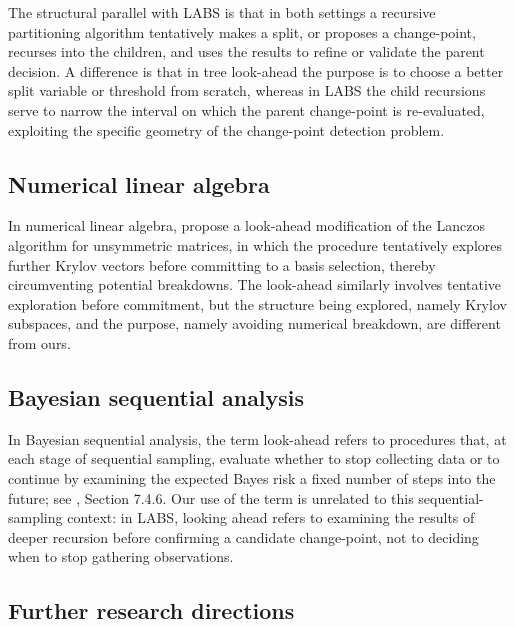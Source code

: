 \documentclass[12pt, a4paper]{article}
\begin{document}
The structural parallel with LABS is that in both settings a recursive partitioning algorithm tentatively makes a split, or proposes a change-point, recurses into the children, and uses the results to refine or validate the parent decision. A difference is that in tree look-ahead the purpose is to choose a better split variable or threshold from scratch, whereas in LABS the child recursions serve to narrow the interval on which the parent change-point is re-evaluated, exploiting the specific geometry of the change-point detection problem.

\subsection{Numerical linear algebra}

In numerical linear algebra, \cite{pt85} propose a look-ahead modification of the Lanczos algorithm for unsymmetric matrices, in which the procedure tentatively explores further Krylov vectors before committing to a basis selection, thereby circumventing potential breakdowns. The look-ahead similarly involves tentative exploration before commitment, but the structure being explored, namely Krylov subspaces, and the purpose, namely avoiding numerical breakdown, are different from ours.

\subsection{Bayesian sequential analysis}

In Bayesian sequential analysis, the term look-ahead refers to procedures that, at each stage of sequential sampling, evaluate whether to stop collecting data or to continue by examining the expected Bayes risk a fixed number of steps into the future; see \cite{b85}, Section 7.4.6. Our use of the term is unrelated to this sequential-sampling context: in LABS, looking ahead refers to examining the results of deeper recursion before confirming a candidate change-point, not to deciding when to stop gathering observations.

\subsection{Further research directions}
\end{document}
